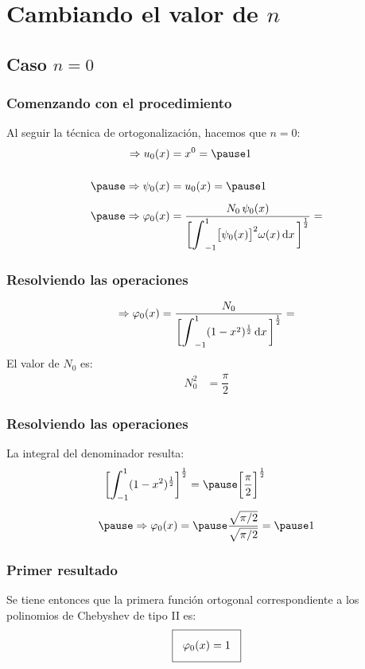 \documentclass[12pt]{beamer}
\begin{document}
\section{Cambiando el valor de \texorpdfstring{$n$}{n}}
\subsection{Caso \texorpdfstring{$n=0$}{n=0}}

\begin{frame}
\frametitle{Comenzando con el procedimiento}
Al seguir la técnica de ortogonalización, \pause hacemos que $n = 0$:
\pause
\begin{eqnarray*}
\begin{aligned}
\Rightarrow u_{0} (x) &=  x^{0} = \pause 1 \\[0.5cm] \pause
\Rightarrow \psi_{0} (x) &= u_{0} (x) = \pause  1 \\[0.5em] \pause
\Rightarrow \varphi_{0} (x) &= \dfrac{N_{0} \, \psi_{0} (x)}{\bigg[ \scaleint{6ex}_{-1}^{1} \big[ \psi_{0} (x) \big]^{2} \omega (x) \dd{x} \bigg]^{\frac{1}{2}}} = 
\end{aligned}
\end{eqnarray*}
\end{frame}
\begin{frame}
\frametitle{Resolviendo las operaciones}
\begin{align*}
\Rightarrow \varphi_{0} (x) = \dfrac{N_{0}}{\bigg[ \scaleint{6ex}_{-1}^{1} (1 -x^{2})^{\frac{1}{2}} \dd{x} \bigg]^{\frac{1}{2}}} =
\end{align*}
El valor de $N_{0}$ es:
\pause
\begin{align*}
N_{0}^{2} &= \dfrac{\pi}{2}
\end{align*}
\end{frame}
\begin{frame}
\frametitle{Resolviendo las operaciones}
La integral del denominador resulta:
\pause
\begin{eqnarray*}
\begin{aligned}
\bigg[ \scaleint{6ex}_{\bs -1}^{1} (&1 - x^{2})^{\frac{1}{2}} \bigg]^{\frac{1}{2}} = \pause \bigg[ \dfrac{\pi}{2} \bigg]^{\frac{1}{2}} \\[0.5em] \pause
&\Rightarrow \varphi_{0}(x) = \pause \dfrac{\sqrt{\pi/2}}{\sqrt{\pi/2}} = \pause 1
\end{aligned}
\end{eqnarray*}
\end{frame}
\begin{frame}
\frametitle{Primer resultado}
Se tiene entonces que la primera función ortogonal correspondiente a los polinomios de Chebyshev de tipo II es:
\pause
\begin{align*}
\setlength{\fboxsep}{3\fboxsep}\boxed{
\varphi_{0} (x) = 1}
\end{align*}
\end{frame}
\end{document}
